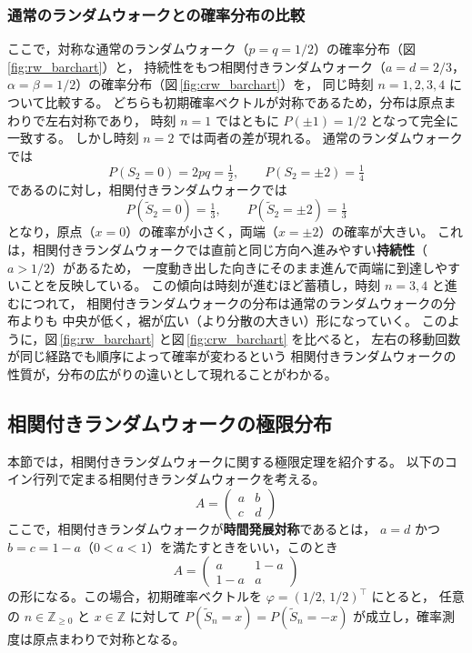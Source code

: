 \documentclass[a4j,dvipdfmx]{jsarticle}
\theoremstyle{plainnote}
\begin{document}
\subsubsection*{通常のランダムウォークとの確率分布の比較}

ここで，対称な通常のランダムウォーク（$p=q=1/2$）の確率分布（図\,\ref{fig:rw_barchart}）と，
持続性をもつ相関付きランダムウォーク（$a=d=2/3$，$\alpha=\beta=1/2$）の確率分布（図\,\ref{fig:crw_barchart}）を，
同じ時刻 $n=1,2,3,4$ について比較する。
どちらも初期確率ベクトルが対称であるため，分布は原点まわりで左右対称であり，
時刻 $n=1$ ではともに $P(\pm 1)=1/2$ となって完全に一致する。
しかし時刻 $n=2$ では両者の差が現れる。
通常のランダムウォークでは
\[
  P(S_2=0)=2pq=\tfrac{1}{2}, \qquad P(S_2=\pm 2)=\tfrac{1}{4}
\]
であるのに対し，相関付きランダムウォークでは
\[
  P(\tilde{S}_2=0)=\tfrac{1}{3}, \qquad P(\tilde{S}_2=\pm 2)=\tfrac{1}{3}
\]
となり，原点（$x=0$）の確率が小さく，両端（$x=\pm 2$）の確率が大きい。
これは，相関付きランダムウォークでは直前と同じ方向へ進みやすい\textbf{持続性}（$a>1/2$）があるため，
一度動き出した向きにそのまま進んで両端に到達しやすいことを反映している。
この傾向は時刻が進むほど蓄積し，時刻 $n=3,4$ と進むにつれて，
相関付きランダムウォークの分布は通常のランダムウォークの分布よりも
中央が低く，裾が広い（より分散の大きい）形になっていく。
このように，図\,\ref{fig:rw_barchart} と図\,\ref{fig:crw_barchart} を比べると，
左右の移動回数が同じ経路でも順序によって確率が変わるという
相関付きランダムウォークの性質が，分布の広がりの違いとして現れることがわかる。

\subsection{相関付きランダムウォークの極限分布}

本節では，相関付きランダムウォークに関する極限定理を紹介する。
以下のコイン行列で定まる相関付きランダムウォークを考える。
\begin{equation}
  A = \begin{pmatrix} a & b \\ c & d \end{pmatrix}
\end{equation}
ここで，相関付きランダムウォークが\textbf{時間発展対称}であるとは，
$a = d$ かつ $b = c = 1 - a$（$0 < a < 1$）を満たすときをいい，このとき
\begin{equation}
  A = \begin{pmatrix} a & 1-a \\ 1-a & a \end{pmatrix}
  \label{eq:sym_corr_matrix}
\end{equation}
の形になる。この場合，初期確率ベクトルを $\varphi = (1/2,\,1/2)^\top$ にとると，
任意の $n \in \mathbb{Z}_{\geq 0}$ と $x \in \mathbb{Z}$ に対して
$P(\tilde{S}_n = x) = P(\tilde{S}_n = -x)$ が成立し，確率測度は原点まわりで対称となる。
\end{document}
